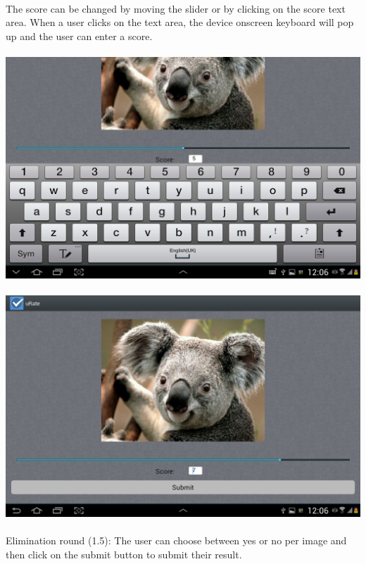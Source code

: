 \documentclass[10pt,a4paper]{article}
\begin{document}
\paragraph{}
The score can be changed by moving the slider or by clicking on the score text area. When a user clicks on the text area, the device onscreen keyboard will pop up and the user can enter a score.
\paragraph{}
\includegraphics[scale=0.3]{Pictures/ScoreKeyboard.png}
\paragraph{}
\includegraphics[scale=0.3]{Pictures/ScoreSlider.png}
\paragraph{}
Elimination round (1.5): 
The user can choose between yes or no per image and then click on the submit button to submit their result.
\end{document}
